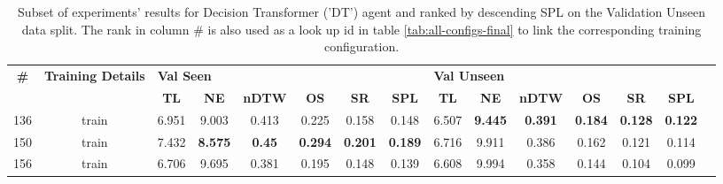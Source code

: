 \begin{table}
\centering
\caption{\label{tab:dt_normalized_visual_features}Subset of experiments' results for Decision Transformer ('DT') agent and ranked by descending SPL on the Validation Unseen data split. The rank in column \# is also used as a look up id in table \ref{tab:all-configs-final} to link the corresponding training configuration.}
\begin{tabular}{@{\hskip3pt}c@{\hskip3pt}c@{\hskip3pt}c@{\hskip3pt}c@{\hskip3pt}c@{\hskip3pt}c@{\hskip3pt}c@{\hskip3pt}c@{\hskip3pt}c@{\hskip3pt}c@{\hskip3pt}c@{\hskip3pt}c@{\hskip3pt}c@{\hskip3pt}c@{\hskip3pt}c}
\toprule
\textbf{\#} & \textbf{Training Details} & \multicolumn{6}{l}{\textbf{Val Seen}} & \multicolumn{6}{l}{\textbf{Val Unseen}} \\
 \textbf{~} &                \textbf{~} &       \textbf{TL} &     \textbf{NE} &  \textbf{nDTW} &     \textbf{OS} &     \textbf{SR} &    \textbf{SPL} &         \textbf{TL} &     \textbf{NE} &   \textbf{nDTW} &     \textbf{OS} &     \textbf{SR} &    \textbf{SPL} \\
\midrule
        136 &                     train &             6.951 &           9.003 &          0.413 &           0.225 &           0.158 &           0.148 &               6.507 &  \textbf{9.445} &  \textbf{0.391} &  \textbf{0.184} &  \textbf{0.128} &  \textbf{0.122} \\
        150 &                     train &             7.432 &  \textbf{8.575} &  \textbf{0.45} &  \textbf{0.294} &  \textbf{0.201} &  \textbf{0.189} &               6.716 &           9.911 &           0.386 &           0.162 &           0.121 &           0.114 \\
        156 &                     train &             6.706 &           9.695 &          0.381 &           0.195 &           0.148 &           0.139 &               6.608 &           9.994 &           0.358 &           0.144 &           0.104 &           0.099 \\
\bottomrule
\end{tabular}
\end{table}
